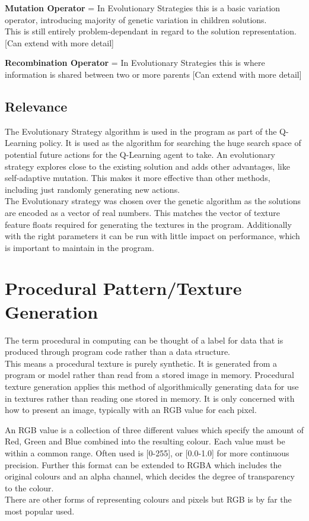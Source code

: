 \documentclass{report}
\begin{document}
\textbf{Mutation Operator} = In Evolutionary Strategies this is a basic variation operator, introducing majority of genetic variation in children solutions.\\
This is still entirely problem-dependant in regard to the solution representation.
[Can extend with more detail]

\textbf{Recombination Operator} = In Evolutionary Strategies this is where information is shared between two or more parents
[Can extend with more detail]

\subsection{Relevance}

The Evolutionary Strategy algorithm is used in the program as part of the Q-Learning policy. It is used as the algorithm for searching the huge search space of potential 
future actions for the Q-Learning agent to take. An evolutionary strategy explores close to the existing solution and adds other advantages, like self-adaptive 
mutation. This makes it more effective than other methods, including just randomly generating new actions.\\
The Evolutionary strategy was chosen over the genetic algorithm as the solutions are encoded as a vector of real numbers. This matches the vector of texture feature floats
required for generating the textures in the program. Additionally with the right parameters it can be run with little impact on performance, which is important to maintain in the program.

\section{Procedural Pattern/Texture Generation}
\label{section:ppg}

The term procedural in computing can be thought of a label for data that is produced through program code rather than a data structure.\\
This means a procedural texture is purely synthetic. It is generated from a program or model rather than read from a stored image in memory.
Procedural texture generation applies this method of algorithmically generating data for use in textures rather than reading one stored in memory. It is only 
concerned with how to present an image, typically with an RGB value for each pixel.

An RGB value is a collection of three different values which specify the amount of Red, Green and Blue combined into the resulting colour. Each value must be within a 
common range. Often used is [0-255], or [0.0-1.0] for more continuous precision. Further this format can be extended to RGBA which includes the original colours and 
an alpha channel, which decides the degree of transparency to the colour.\\
There are other forms of representing colours and pixels but RGB is by far the most popular used.
\end{document}
